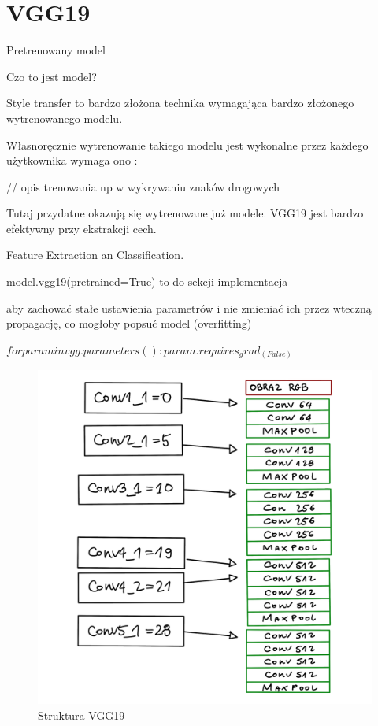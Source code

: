 \documentclass[brudnopis]{xmgr}
\begin{document}
\section{VGG19\label{s:dsssl}}

Pretrenowany model 


Czo to jest model? 

Style transfer to bardzo złożona technika wymagająca bardzo złożonego wytrenowanego modelu.

Własnoręcznie wytrenowanie takiego modelu jest wykonalne przez każdego użytkownika wymaga ono : 

// opis trenowania np w wykrywaniu znaków drogowych 

Tutaj przydatne okazują się wytrenowane już modele. 
VGG19 jest bardzo efektywny przy ekstrakcji cech.

Feature Extraction an Classification.

model.vgg19(pretrained=True) to do sekcji implementacja 

aby zachować stałe ustawienia parametrów i nie zmieniać ich przez wteczną propagację, co mogłoby popsuć model (overfitting)

$for param in vgg.parameters():
	param.requires_grad_(False)$
	


\begin{figure}[!tbh]
\centering
\includegraphics[width=.8\hsize]{fig/7}
\caption{Struktura VGG19\label{RYS.4}}
\end{figure}
\end{document}

